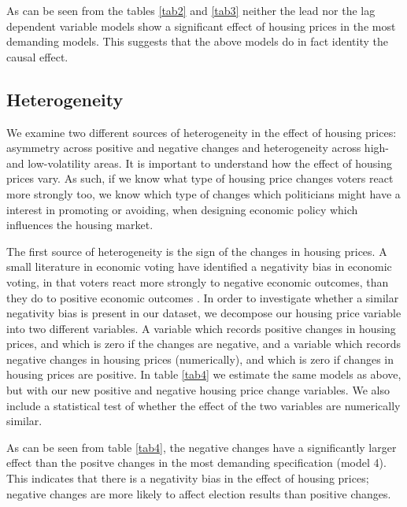 \documentclass[12pt,a4paper]{article}
\begin{document}





As can be seen from the tables \ref{tab2} and \ref{tab3} neither the lead nor the lag dependent variable models show a significant  effect of housing prices in the most demanding models. This suggests that the above models do in fact identity the causal effect.



\subsection{Heterogeneity}

We examine two different sources of heterogeneity in the effect of housing prices: asymmetry across positive and negative changes and heterogeneity across high- and low-volatility areas.  It is important to understand how the effect of housing prices vary. As such, if we know what type of housing price changes voters react more strongly too, we know which type of changes which politicians might have a interest in promoting or avoiding,  when designing economic policy which influences the housing market. %

The first source of heterogeneity is the sign of the changes in housing prices. A small literature in economic voting have identified a negativity bias in economic voting, in that voters react more strongly to negative economic outcomes, than they do to positive economic outcomes \citep[e.g.][]{bloom1975voter}. In order to investigate whether a similar negativity bias is present in our dataset, we decompose our housing price variable into two different variables. A variable which records positive changes in housing prices, and which is zero if the changes are negative, and a variable which records negative changes in housing prices (numerically), and which is zero if changes in housing prices are positive. In table \ref{tab4} we estimate the same models as above, but with our new positive and negative housing price change variables. We also include a statistical test of whether the effect of the two variables are numerically similar. 

As can be seen from table \ref{tab4}, the negative changes have a significantly larger effect than the positve changes in the most demanding specification (model 4). This indicates that there is a negativity bias in the effect of housing prices; negative changes are more likely to affect election results than positive changes. 
\end{document}

